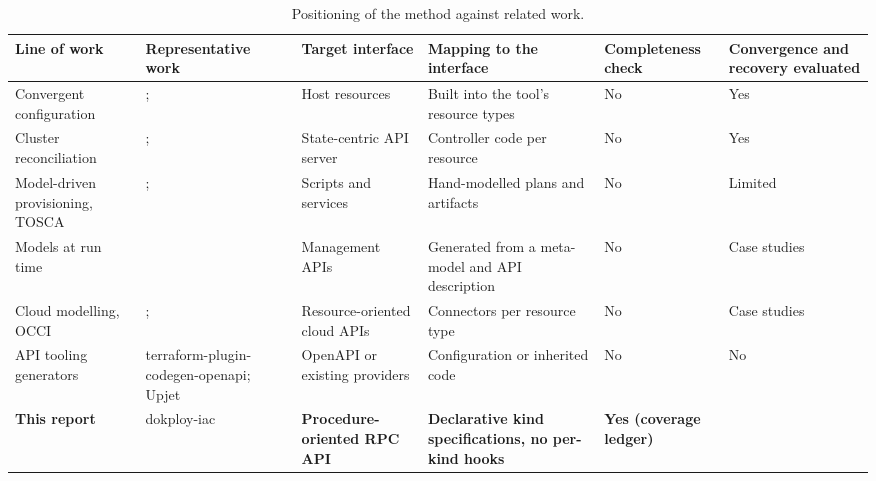 \begin{table}[tbp]
\centering
\small
\caption{Positioning of the method against related work.}
\label{tab:1}
\begin{tabularx}{\linewidth}{LLLLlL}
\toprule
Line of work & Representative work & Target interface & Mapping to the interface & Completeness check & Convergence and recovery evaluated \\
\midrule
Convergent configuration & \citealp{hanappi2016}; \citealp{shambaugh2016} & Host resources & Built into the tool's resource types & No & Yes \\
Cluster reconciliation & \citealp{sun2022}; \citealp{gu2023} & State-centric API server & Controller code per resource & No & Yes \\
Model-driven provisioning, TOSCA & \citealp{maghraoui2006}; \citealp{breitenbucher2014} & Scripts and services & Hand-modelled plans and artifacts & No & Limited \\
Models at run time & \citealp{song2010a,song2010b} & Management APIs & Generated from a meta-model and API description & No & Case studies \\
Cloud modelling, OCCI & \citealp{ferry2018}; \citealp{zalila2019} & Resource-oriented cloud APIs & Connectors per resource type & No & Case studies \\
API tooling generators & terraform-plugin-codegen-openapi; Upjet & OpenAPI or existing providers & Configuration or inherited code & No & No \\
\textbf{This report} & dokploy-iac & \textbf{Procedure-oriented RPC API} & \textbf{Declarative kind specifications, no per-kind hooks} & \textbf{Yes (coverage ledger)} & \textbf{\result{}} \\
\bottomrule
\end{tabularx}
\end{table}
